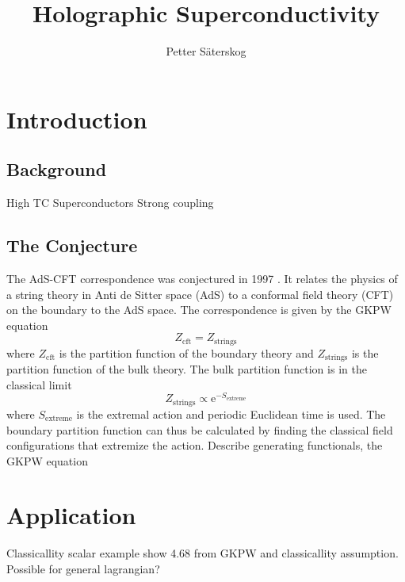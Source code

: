 \documentclass[12pt]{article}
\title{Holographic Superconductivity}
\author{Petter Säterskog}
\begin{document}
\maketitle
\tableofcontents

\section{Introduction}
\subsection{Background}
High TC Superconductors
Strong coupling
\subsection{The Conjecture}
The AdS-CFT correspondence was conjectured in 1997 \cite{Maldacena:1997re}. It relates the physics of a string theory in Anti de Sitter space (AdS) to a conformal field theory (CFT) on the boundary to the AdS space. The correspondence is given by the GKPW equation \cite{Witten:1998qj}
\begin{equation}
 Z_{\text{cft}}=Z_{\text{strings}}
\end{equation}
where $Z_{\text{cft}}$ is the partition function of the boundary theory and $Z_{\text{strings}}$ is the partition function of the bulk theory. The bulk partition function is in the classical limit
\begin{equation}
 Z_{\text{strings}}\propto\mathrm{e}^{-S_\text{extreme}}
\end{equation}
where $S_\text{extreme}$ is the extremal action and periodic Euclidean time is used. The boundary partition function can thus be calculated by finding the classical field configurations that extremize the action.
Describe generating functionals, the GKPW equation
\section{Application}
Classicallity
scalar example
show 4.68 from GKPW and classicallity assumption. Possible for general lagrangian?
\end{document}
